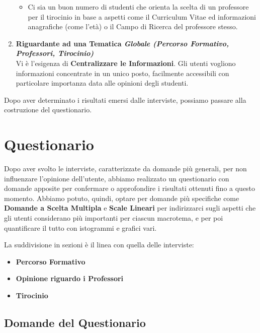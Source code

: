 \begin{enumerate}
\begin{itemize}
        \item Ci sia un buon numero di studenti che orienta la scelta di un professore per il tirocinio in base a aspetti come il Curriculum Vitae ed informazioni anagrafiche (come l'età) o il Campo di Ricerca del professore stesso.
    \end{itemize}  
    \item \textbf{Riguardante ad una Tematica \textit{Globale (Percorso Formativo, Professori, Tirocinio)}}\\
    Vi è l'esigenza di \textbf{Centralizzare le Informazioni}.
    Gli utenti vogliono informazioni concentrate in un unico posto, facilmente accessibili con particolare importanza data alle opinioni degli studenti.
    
\end{enumerate}

Dopo aver determinato i risultati emersi dalle interviste, possiamo passare alla costruzione del questionario.



\section{Questionario}

Dopo aver svolto le interviste, caratterizzate da domande più generali, per non influenzare l'opinione dell'utente, abbiamo realizzato un questionario
con domande apposite per confermare o approfondire i risultati ottenuti fino a questo momento. Abbiamo potuto, quindi, optare per domande più specifiche
come \textbf{Domande a Scelta Multipla} e \textbf{Scale Lineari} per indirizzarci sugli aspetti che gli utenti considerano più importanti per ciascun macrotema,
e per poi quantificare il tutto con istogrammi e grafici vari.

La suddivisione in sezioni è il linea con quella delle interviste:
\begin{itemize}
    \item \textbf{Percorso Formativo}
    \item \textbf{Opinione riguardo i Professori}
    \item \textbf{Tirocinio}
\end{itemize}


\subsection{Domande del Questionario}

